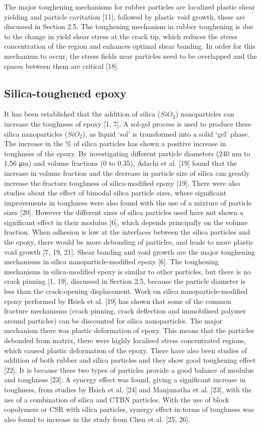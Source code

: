 \documentclass[numbers=noendperiod,chapterprefix=on]{icldt} %
\begin{document}
The major toughening mechanisms for rubber particles are localized plastic shear yielding and particle cavitation [11], followed by plastic void growth, these are discussed in Section 2.5. The toughening mechanism in rubber toughening is due to the change in yield shear stress at the crack tip, which reduces the stress concentration of the region and enhances optimal shear banding. In order for this mechanism to occur, the stress fields near particles need to be overlapped and the spaces between them are critical [18]. 

\subsection{Silica-toughened epoxy}
It has been established that the addition of silica ($SiO_2$) nanoparticles can increase the toughness of epoxy [1, 7]. A sol-gel process is used to produce these silica nanoparticles ($SiO_2$), as liquid ‘sol’ is transformed into a solid ‘gel’ phase. The increase in the \% of silica particles has shown a positive increase in toughness of the epoxy. By investigating different particle diameters (240 nm to 1.56 μm) and volume fractions (0 to 0.35), Adachi et al. [19] found that the increase in volume fraction and the decrease in particle size of silica can greatly increase the fracture toughness of silica-modified epoxy [19]. There were also studies about the effect of bimodal silica particle sizes, where significant improvements in toughness were also found with the use of a mixture of particle sizes [20]. However the different sizes of silica particles used have not shown a significant effect in their modulus [6], which depends principally on the volume fraction. 
When adhesion is low at the interfaces between the silica particles and the epoxy, there would be more debonding of particles, and leads to more plastic void growth [7, 19, 21]. Shear banding and void growth are the major toughening mechanisms in silica nanoparticle-modified epoxy [6].
The toughening mechanisms in silica-modified epoxy is similar to other particles, but there is no crack pinning [1, 19], discussed in Section 2.5, because the particle diameter is less than the crack-opening displacement. Work on silica nanoparticle-modified epoxy performed by Hsieh et al. [19] has shown that some of the common fracture mechanisms (crack pinning, crack deflection and immobilised polymer around particles) can be discounted for silica nanoparticles. The major mechanism there was plastic deformation of epoxy. This means that the particles debonded from matrix, there were highly localised stress concentrated regions, which caused plastic deformation of the epoxy. 
There have also been studies of addition of both rubber and silica particles and they show good toughening effect [22]. It is because these two types of particles provide a good balance of modulus and toughness [23]. A synergy effect was found, giving a significant increase in toughness, from studies by Hsieh et al. [24] and Manjunatha et al. [23], with the use of a combination of silica and CTBN particles. With the use of block copolymers or CSR with silica particles, synergy effect in terms of toughness was also found to increase in the study from Chen et al. [25, 26]. 
\end{document}
